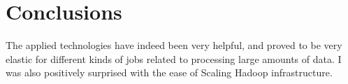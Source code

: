 \chapter{Conclusions}

The applied technologies have indeed been very helpful, and proved to be very elastic for different kinds of jobs related to processing large amounts of data. I was also positively surprised with the ease of Scaling Hadoop infrastructure.

